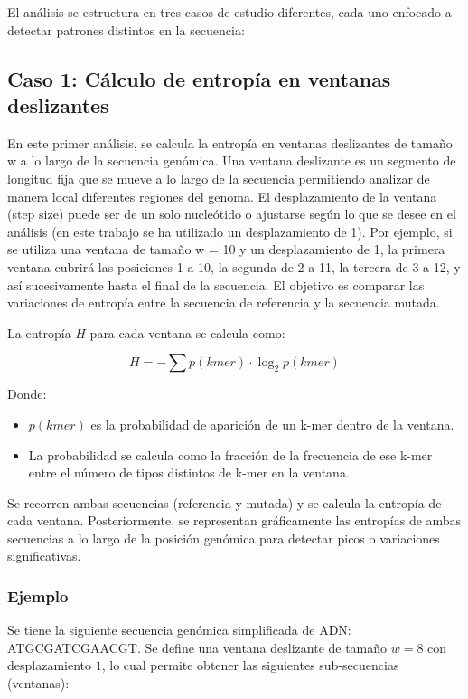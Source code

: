 \documentclass[11pt,spanish,listoffigures,listoftables]{tfgetsinf}
\begin{document}
El análisis se estructura en tres casos de estudio diferentes, cada uno enfocado a detectar patrones distintos en la secuencia:

\subsection{Caso 1: Cálculo de entropía en ventanas deslizantes}

En este primer análisis, se calcula la entropía en ventanas deslizantes de tamaño w a lo largo de la secuencia genómica. Una ventana deslizante es un segmento de longitud fija que se mueve a lo largo de la secuencia permitiendo analizar de manera local diferentes regiones del genoma. El desplazamiento de la ventana (step size) puede ser de un solo nucleótido o ajustarse según lo que se desee en el análisis (en este trabajo se ha utilizado un desplazamiento de 1). Por ejemplo, si se utiliza una ventana de tamaño w = 10 y un desplazamiento de 1, la primera ventana cubrirá las posiciones 1 a 10, la segunda de 2 a 11, la tercera de 3 a 12, y así sucesivamente hasta el final de la secuencia. El objetivo es comparar las variaciones de entropía entre la secuencia de referencia y la secuencia mutada.

La entropía $H$ para cada ventana se calcula como:

\[
H = - \sum p(kmer) \cdot \log_2 p(kmer)
\]

Donde:

\begin{itemize}
   \item $p(kmer)$ es la probabilidad de aparición de un k-mer dentro de la ventana.
   \item La probabilidad se calcula como la fracción de la frecuencia de ese k-mer entre el número de tipos distintos de k-mer en la ventana.
\end{itemize}

Se recorren ambas secuencias (referencia y mutada) y se calcula la entropía de cada ventana. Posteriormente, se representan gráficamente las entropías de ambas secuencias a lo largo de la posición genómica para detectar picos o variaciones significativas.

\subsubsection{Ejemplo}

Se tiene la siguiente secuencia genómica simplificada de ADN: ATGCGATCGAACGT. Se define una ventana deslizante de tamaño $w = 8$ con desplazamiento $1$, lo cual permite obtener las siguientes sub-secuencias (ventanas):
\end{document}
